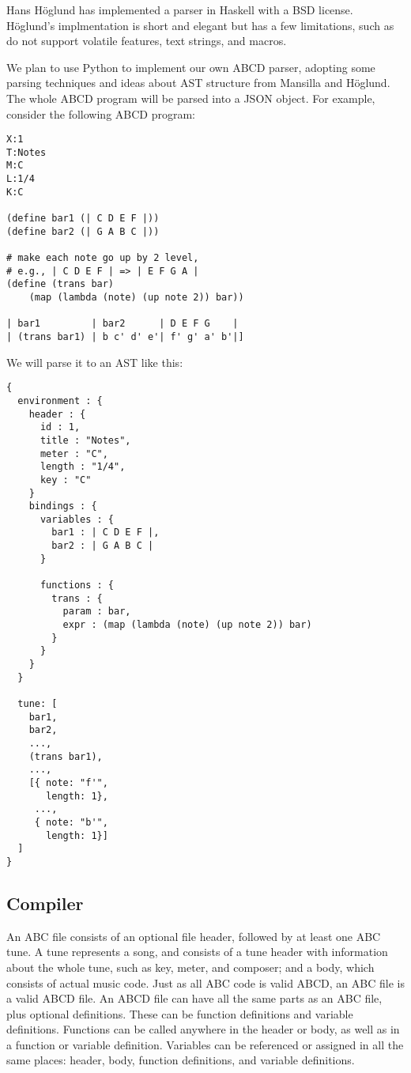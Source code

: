 Hans H\"{o}glund has implemented a parser in Haskell\cite{Hoglund15} with a BSD license. H\"{o}glund's implmentation is short and elegant but has a few limitations, such as do not support volatile features, text strings, and macros.

We plan to use Python to implement our own ABCD parser, adopting some parsing techniques and ideas about AST structure from Mansilla and H\"{o}glund. The whole ABCD program will be parsed into a JSON object. For example, consider the following ABCD program:
\begin{verbatim}
X:1
T:Notes
M:C
L:1/4
K:C

(define bar1 (| C D E F |))
(define bar2 (| G A B C |))

# make each note go up by 2 level,
# e.g., | C D E F | => | E F G A |
(define (trans bar)
    (map (lambda (note) (up note 2)) bar))

| bar1         | bar2      | D E F G    |
| (trans bar1) | b c' d' e'| f' g' a' b'|]
\end{verbatim}

We will parse it to an AST like this:
\begin{verbatim}
{
  environment : {
    header : {
      id : 1,
      title : "Notes",
      meter : "C",
      length : "1/4",
      key : "C"
    }
    bindings : {
      variables : {
        bar1 : | C D E F |,
        bar2 : | G A B C |
      }

      functions : {
        trans : {
          param : bar,
          expr : (map (lambda (note) (up note 2)) bar)
        }
      }
    }
  }

  tune: [
    bar1,
    bar2,
    ...,
    (trans bar1),
    ...,
    [{ note: "f'",
       length: 1},
     ...,
     { note: "b'",
       length: 1}]
  ]
}
\end{verbatim}

\subsection{Compiler}
An ABC file consists of an optional file header, followed by at least one ABC tune. A tune represents a song, and consists of a tune header with information about the whole tune, such as key, meter, and composer; and a body, which consists of actual music code\cite{Walshaw11}. Just as all ABC code is valid ABCD, an ABC file is a valid ABCD file. An ABCD file can have all the same parts as an ABC file, plus optional definitions. These can be function definitions and variable definitions. Functions can be called anywhere in the header or body, as well as in a function or variable definition. Variables can be referenced or assigned in all the same places: header, body, function definitions, and variable definitions.
    
